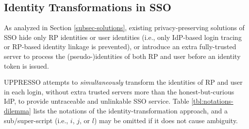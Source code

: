 
\subsection{Identity Transformations in SSO}
\label{subsec:solutions}


As analyzed in Section \ref{subsec-solutions},
    existing privacy-preserving solutions of SSO hide only RP identities or user identities
    (i.e., only IdP-based login tracing or RP-based identity linkage is prevented),
        or introduce an extra fully-trusted server to process the (pseudo-)identities of both RP and user before an identity token is issued.

UPPRESSO attempts to \emph{simultaneously} transform the identities of RP and user in each login,
        without extra trusted servers more than the honest-but-curious IdP,
         to provide untraceable and unlinkable SSO service.
%
Table \ref{tbl:notations-dilemma} lists the notations of the identity-transformation approach,
and a sub/super-script (i.e., $i$, $j$, or $l$) may be omitted if it does not cause ambiguity.

